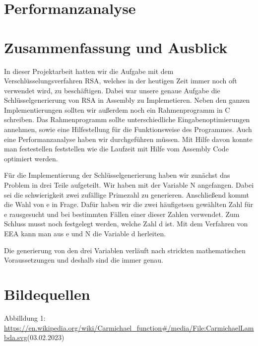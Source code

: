 \documentclass[course=asp]{aspdoc}
\begin{document}
\section{Performanzanalyse}


\section{Zusammenfassung und Ausblick}
In dieser Projektarbeit hatten wir die Aufgabe mit dem Verschlüsselungsverfahren RSA, welches in der heutigen Zeit immer noch oft verwendet wird, zu beschäftigen. Dabei war unsere genaue Aufgabe die Schlüsselgenerierung von RSA in Assembly zu Implemetieren. Neben den ganzen Implementierungen sollten wir außerdem noch ein Rahmenprogramm in C schreiben. Das Rahmenprogramm sollte unterschiedliche Eingabenoptimierungen annehmen, sowie eine Hilfestellung für die Funktionsweise des Programmes. Auch eine Performanzanalyse haben wir durchgeführen müssen. Mit Hilfe davon konnte man festestellen feststellen wie die Laufzeit mit Hilfe vom Assembly Code optimiert werden. 

Für die Implementierung der Schlüsselgenerierung haben wir zunächst das Problem in drei Teile aufgeteilt. Wir haben mit der Variable N angefangen. Dabei sei die schwierigkeit zwei zufällige Primezahl zu generieren. Anschließend kommt die Wahl von e in Frage. Dafür haben wir die zwei häufigetsen gewählten Zahl für e rausgesucht und bei bestimmten Fällen einer dieser Zahlen verwendet. Zum Schluss musst noch festgelegt werden, welche Zahl d ist. Mit dem Verfahren von EEA kann man aus e und N die Variable d herleiten. 

Die generierung von den drei Variablen verläuft nach strickten mathematischen Voraussetzungen und deshalb sind die immer genau. 

\section{Bildequellen}
Abbilldung 1: \url{https://en.wikipedia.org/wiki/Carmichael_function#/media/File:CarmichaelLambda.svg}(03.02.2023)


{}
\end{document}
